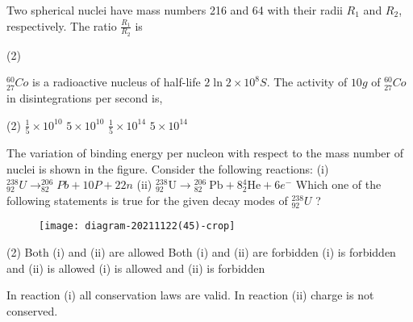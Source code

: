 \begin{enumerate}[ label=\color{ocre}\textbf{\arabic*.}]
\begin{tasks}
\end{tasks}
\begin{minipage}{\textwidth}
	\item Two spherical nuclei have mass numbers 216 and 64 with their radii $R_{1}$ and $R_{2}$, respectively. The ratio $\frac{R_{1}}{R_{2}}$ is
\end{minipage}
\begin{tasks}(2)
\end{tasks}
\begin{minipage}{\textwidth}
	\item ${ }_{27}^{60} C o$ is a radioactive nucleus of half-life $2 \ln 2 \times 10^{8} S .$ The activity of $10 g$ of ${ }_{27}^{60} C o$ in disintegrations per second is,
\end{minipage}
\begin{tasks}(2)
	\task[\textbf{A.}]$\frac{1}{5} \times 10^{10}$
	\task[\textbf{B.}]$5 \times 10^{10}$
	\task[\textbf{C.}] $\frac{1}{5} \times 10^{14}$
	\task[\textbf{D.}] $5 \times 10^{14}$
\end{tasks}
\begin{minipage}{\textwidth}
	\item The variation of binding energy per nucleon with respect to the mass number of nuclei is shown in the figure.
	Consider the following reactions:
	(i) ${ }_{92}^{238} U \rightarrow_{82}^{206} P b+10 P+22 n$
	(ii) ${ }_{92}^{238} \mathrm{U} \rightarrow{ }_{82}^{206} \mathrm{~Pb}+8{ }_{2}^{4} \mathrm{He}+6 e^{-}$
	Which one of the following statements is true for the given decay modes of ${ }_{92}^{238} U$ ?
	\\
	\begin{figure}[H]
		\centering
		\texttt{[image: diagram-20211122(45)-crop]}
	\end{figure}
\end{minipage}
\begin{tasks}(2)
	\task[\textbf{A.}]Both (i) and (ii) are allowed
	\task[\textbf{B.}]Both (i) and (ii) are forbidden
	\task[\textbf{C.}](i) is forbidden and (ii) is allowed
	\task[\textbf{D.}](i) is allowed and (ii) is forbidden
\end{tasks}
\begin{answer}
 In reaction (i) all conservation laws are valid. In reaction (ii) charge is not conserved.\\

\end{answer}
\end{enumerate}
